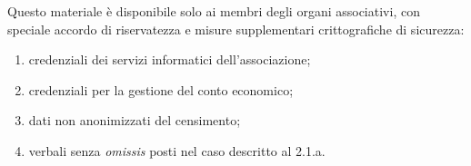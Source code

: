 Questo materiale è disponibile solo ai membri degli organi associativi,
con speciale accordo di riservatezza e misure supplementari
crittografiche di sicurezza:

\begin{enumerate}
    \item
        credenziali dei servizi informatici dell'associazione;
    \item
        credenziali per la gestione del conto economico;
    \item
        dati non anonimizzati del censimento;
    \item
        verbali senza \emph{omissis} posti nel caso descritto al 2.1.a.
\end{enumerate}

